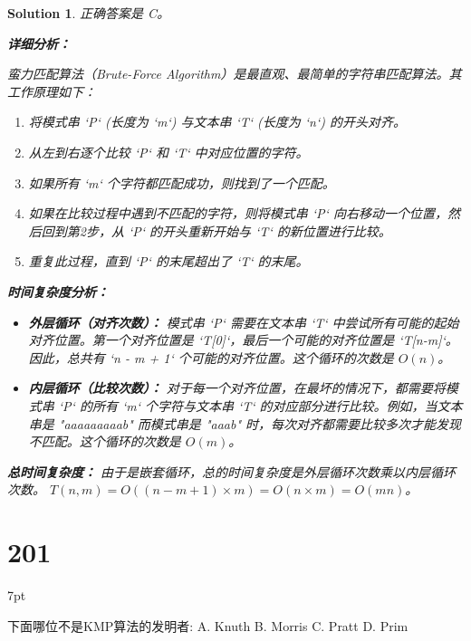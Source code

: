 \documentclass[UTF8]{report}
\newtheorem{solution}{Solution}
\theoremstyle{MyLineTheoremStyle} %
\theoremstyle{MyBlockTheoremStyle} %
\theoremstyle{MySubsubsectionStyle} %
\newenvironment{graybox}{%
        \def\FrameCommand{%
        \hspace{1pt}%
        {\color{gray}\small \vrule width 2pt}%
        {\color{graybox_color}\vrule width 4pt}%
        \colorbox{graybox_color}%
        }%
        \MakeFramed{\advance\hsize-\width\FrameRestore}%
        \noindent\hspace{-4.55pt}%
        \begin{adjustwidth}{}{7pt}%
        \vspace{2pt}\vspace{2pt}%
        }
        {%
        \vspace{2pt}\end{adjustwidth}\endMakeFramed%
        }
\begin{document}
\begin{solution}
正确答案是 C。

\textbf{详细分析：}

蛮力匹配算法（Brute-Force Algorithm）是最直观、最简单的字符串匹配算法。其工作原理如下：

\begin{enumerate}
    \item 将模式串 `P` (长度为 `m`) 与文本串 `T` (长度为 `n`) 的开头对齐。
    \item 从左到右逐个比较 `P` 和 `T` 中对应位置的字符。
    \item 如果所有 `m` 个字符都匹配成功，则找到了一个匹配。
    \item 如果在比较过程中遇到不匹配的字符，则将模式串 `P` 向右移动一个位置，然后回到第2步，从 `P` 的开头重新开始与 `T` 的新位置进行比较。
    \item 重复此过程，直到 `P` 的末尾超出了 `T` 的末尾。
\end{enumerate}

\textbf{时间复杂度分析：}
\begin{itemize}
    \item \textbf{外层循环（对齐次数）：} 模式串 `P` 需要在文本串 `T` 中尝试所有可能的起始对齐位置。第一个对齐位置是 `T[0]`，最后一个可能的对齐位置是 `T[n-m]`。因此，总共有 `n - m + 1` 个可能的对齐位置。这个循环的次数是 $O(n)$。
    \item \textbf{内层循环（比较次数）：} 对于每一个对齐位置，在最坏的情况下，都需要将模式串 `P` 的所有 `m` 个字符与文本串 `T` 的对应部分进行比较。例如，当文本串是 "aaaaaaaaab" 而模式串是 "aaab" 时，每次对齐都需要比较多次才能发现不匹配。这个循环的次数是 $O(m)$。
\end{itemize}

\textbf{总时间复杂度：}
由于是嵌套循环，总的时间复杂度是外层循环次数乘以内层循环次数。
$T(n, m) = O((n - m + 1) \times m) = O(n \times m) = O(mn)$。
\end{solution}

\section*{201}
\begin{graybox}
下面哪位不是KMP算法的发明者:
A. Knuth
B. Morris
C. Pratt
D. Prim
\end{graybox}
\end{document}

